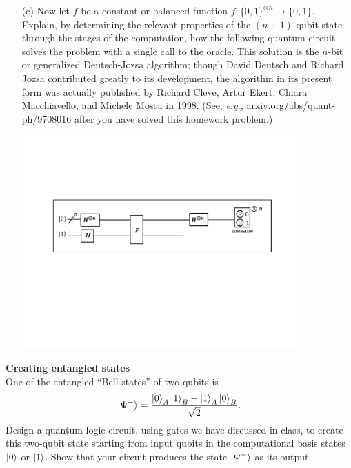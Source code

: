 \documentclass[12pt,letterpaper,boxed,cm]{hmcpset}
\begin{document}
\begin{problem}[1. cont.]
    \begin{enumerate}
        \item [(c)] Now let $f$ be a constant or balanced function $f:\{0,1\}^{\otimes n} \rightarrow \{0,1\}$.  Explain, by determining the relevant properties of the $(n+1)$-qubit state through the stages of the computation, how the following quantum circuit solves the problem with a single call to the oracle.  This solution is the $n$-bit or generalized Deutsch-Jozsa algorithm; though David Deutsch and Richard Jozsa contributed greatly to its development, the algorithm in its present form was actually published by Richard Cleve, Artur Ekert, Chiara Macchiavello, and Michele Mosca in 1998. (See, \textit{e.g.}, arxiv.org/abs/quant-ph/9708016 after you have solved this homework problem.)
        \begin{center}
            \includegraphics[width=300pt]{fig2-1-1.pdf} 
        \end{center}
    \end{enumerate}
\end{problem}

\begin{solution}
    \vfill
\end{solution}
\newpage

\begin{problem}[2.]
    \textbf{Creating entangled states}\\
    One of the entangled ``Bell states'' of two qubits is
    \[
        \ket{\Psi^-} = \frac{\ket{0}_A\ket{1}_B - \ket{1}_A\ket{0}_B}{\sqrt{2}}.
    \]
    Design a quantum logic circuit, using gates we have discussed in class, to create this two-qubit state starting from input qubits in the computational basis states $\ket{0}$ or $\ket{1}$.  Show that your circuit produces the state $\ket{\Psi^-}$ as its output.
\end{problem}
\end{document}
